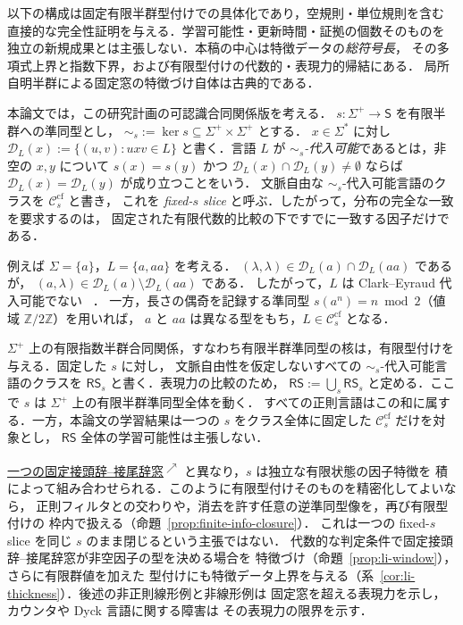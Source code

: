 \documentclass[11pt,a4paper]{ltjsarticle}
\newcommand{\fwdlink}[2]{%
  \hyperlink{#1}{#2\textsuperscript{\(\nearrow\)}}%
}
\theoremstyle{remark}
\theoremstyle{plain}
\newcommand{\D}{\mathcal{D}}
\newcommand{\cf}{\mathrm{cf}}
\newcommand{\Ccf}[1]{\mathcal C_{#1}^{\cf}}
\begin{document}
以下の構成は固定有限半群型付けでの具体化であり，空規則・単位規則を含む
直接的な完全性証明を与える．学習可能性・更新時間・証拠の個数そのものを
独立の新規成果とは主張しない．本稿の中心は特徴データの\emph{総符号長}，
その多項式上界と指数下界，および有限型付けの代数的・表現力的帰結にある．
局所自明半群による固定窓の特徴づけ自体は古典的である．

本論文では，この研究計画の可認識合同関係版を考える．
$s:\Sigma^+\to\mathsf S$ を有限半群への準同型とし，
$\sim_s:=\ker s\subseteq\Sigma^+\times\Sigma^+$ とする．
$x\in\Sigma^*$ に対し
$\D_L(x):=\{(u,v):uxv\in L\}$
と書く．言語 $L$ が \emph{$\sim_s$-代入可能}であるとは，非空の $x,y$ について
$s(x)=s(y)$ かつ $\D_L(x)\cap\D_L(y)\ne\emptyset$ ならば
$\D_L(x)=\D_L(y)$ が成り立つことをいう．
文脈自由な $\sim_s$-代入可能言語のクラスを $\Ccf{s}$ と書き，
これを \emph{fixed-$s$ slice} と呼ぶ．したがって，分布の完全な一致を要求するのは，
固定された有限代数的比較の下ですでに一致する因子だけである．

例えば $\Sigma=\{a\}$，$L=\{a,aa\}$ を考える．
$(\lambda,\lambda)\in\D_L(a)\cap\D_L(aa)$ であるが，
$(a,\lambda)\in\D_L(a)\setminus\D_L(aa)$ である．
したがって，$L$ は Clark--Eyraud 代入可能でない
~\cite[Section~6.1]{clark-eyraud2007}．
一方，長さの偶奇を記録する準同型
$s(a^n)=n\bmod 2$（値域 $\mathbb Z/2\mathbb Z$）を用いれば，
$a$ と $aa$ は異なる型をもち，$L\in\Ccf{s}$ となる．

$\Sigma^+$ 上の有限指数半群合同関係，すなわち有限半群準同型の核は，有限型付けを与える．固定した $s$ に対し，
文脈自由性を仮定しないすべての $\sim_s$-代入可能言語のクラスを
$\mathsf{RS}_s$ と書く．表現力の比較のため，
$\mathsf{RS}:=\bigcup_s\mathsf{RS}_s$
と定める．ここで $s$ は $\Sigma^+$ 上の有限半群準同型全体を動く．
すべての正則言語はこの和に属する．一方，本論文の学習結果は一つの
$s$ をクラス全体に固定した $\Ccf{s}$ だけを対象とし，
$\mathsf{RS}$ 全体の学習可能性は主張しない．

\fwdlink{def:kl-subst}{一つの固定接頭辞--接尾辞窓}と異なり，$s$ は独立な有限状態の因子特徴を
積によって組み合わせられる．このように有限型付けそのものを精密化してよいなら，
正則フィルタとの交わりや，消去を許す任意の逆準同型像を，再び有限型付けの
枠内で扱える（命題~\ref{prop:finite-info-closure}）．
これは一つの fixed-$s$ slice を同じ $s$ のまま閉じるという主張ではない．
代数的な判定条件で固定接頭辞--接尾辞窓が非空因子の型を決める場合を
特徴づけ（命題~\ref{prop:li-window}），さらに有限群値を加えた
型付けにも特徴データ上界を与える（系~\ref{cor:li-thickness}）．後述の非正則線形例と非線形例は
固定窓を超える表現力を示し，カウンタや Dyck 言語に関する障害は
その表現力の限界を示す．
\end{document}
